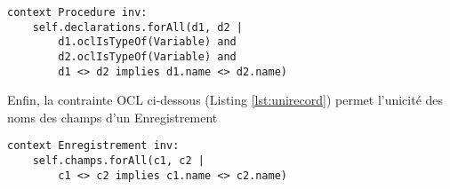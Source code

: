 \begin{lstlisting}[caption={Unicité des noms des variables d'une procédure},captionpos=b,label={lst:univarproc},language=OCL]
context Procedure inv:
	self.declarations.forAll(d1, d2 |
		d1.oclIsTypeOf(Variable) and
		d2.oclIsTypeOf(Variable) and
		d1 <> d2 implies d1.name <> d2.name)
\end{lstlisting}

Enfin, la contrainte OCL ci-dessous (Listing \ref{lst:unirecord}) permet l'unicité des noms des champs d'un Enregistrement

\begin{lstlisting}[caption={Unicité des noms des champs d'un enregistrement},captionpos=b,label={lst:unirecord},language=OCL]
context Enregistrement inv:
	self.champs.forAll(c1, c2 | 
		c1 <> c2 implies c1.name <> c2.name)
\end{lstlisting} 
